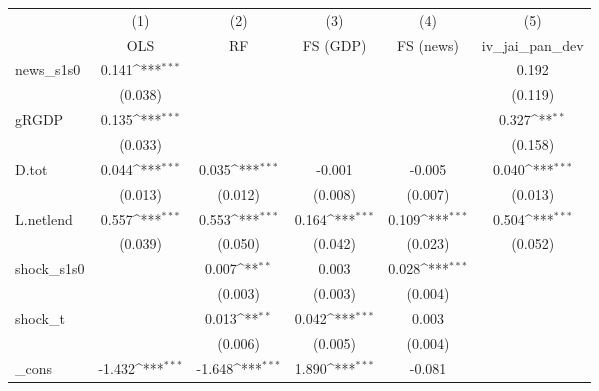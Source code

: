 {
\def\sym#1{\ifmmode^{#1}\else\(^{#1}\)\fi}
\begin{tabular}{l*{5}{c}}
\toprule
            &\multicolumn{1}{c}{(1)}&\multicolumn{1}{c}{(2)}&\multicolumn{1}{c}{(3)}&\multicolumn{1}{c}{(4)}&\multicolumn{1}{c}{(5)}\\
            &\multicolumn{1}{c}{OLS}&\multicolumn{1}{c}{RF}&\multicolumn{1}{c}{FS (GDP)}&\multicolumn{1}{c}{FS (news)}&\multicolumn{1}{c}{iv\_jai\_pan\_dev}\\
\midrule
news\_s1s0   &       0.141\sym{***}&                     &                     &                     &       0.192         \\
            &     (0.038)         &                     &                     &                     &     (0.119)         \\
\addlinespace
gRGDP       &       0.135\sym{***}&                     &                     &                     &       0.327\sym{**} \\
            &     (0.033)         &                     &                     &                     &     (0.158)         \\
\addlinespace
D.tot       &       0.044\sym{***}&       0.035\sym{***}&      -0.001         &      -0.005         &       0.040\sym{***}\\
            &     (0.013)         &     (0.012)         &     (0.008)         &     (0.007)         &     (0.013)         \\
\addlinespace
L.netlend   &       0.557\sym{***}&       0.553\sym{***}&       0.164\sym{***}&       0.109\sym{***}&       0.504\sym{***}\\
            &     (0.039)         &     (0.050)         &     (0.042)         &     (0.023)         &     (0.052)         \\
\addlinespace
shock\_s1s0  &                     &       0.007\sym{**} &       0.003         &       0.028\sym{***}&                     \\
            &                     &     (0.003)         &     (0.003)         &     (0.004)         &                     \\
\addlinespace
shock\_t     &                     &       0.013\sym{**} &       0.042\sym{***}&       0.003         &                     \\
            &                     &     (0.006)         &     (0.005)         &     (0.004)         &                     \\
\addlinespace
\_cons      &      -1.432\sym{***}&      -1.648\sym{***}&       1.890\sym{***}&      -0.081         &                     \\

\end{tabular}}
